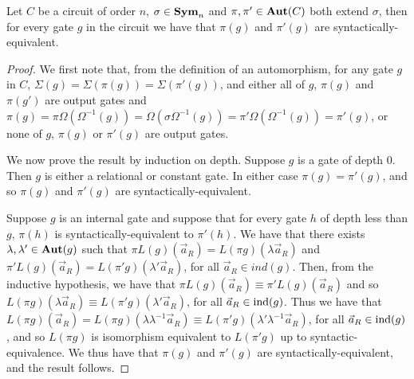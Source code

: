 \documentclass[../paper.tex]{subfiles}
\begin{document}
\begin{lem}
  Let $C$ be a circuit of order $n$, $\sigma \in \text{\textbf{Sym}}_n$ and $\pi, \pi' \in
  \text{\textbf{Aut}}(C)$ both extend $\sigma$, then for every gate $g$ in the circuit we have
  that $\pi (g)$ and $\pi'(g)$ are syntactically-equivalent.
  \label{lem:permutation-extending-syntactic-equivalence}
\end{lem}
\begin{proof}
  We first note that, from the definition of an automorphism, for any gate $g$
  in $C$, $\Sigma (g) = \Sigma (\pi (g)) = \Sigma (\pi' (g))$, and either all of
  $g$, $\pi (g)$ and $\pi (g')$ are output gates and $\pi (g) = \pi \Omega
  (\Omega^{-1}(g)) = \Omega (\sigma \Omega^{-1}(g)) = \pi' \Omega
  (\Omega^{-1}(g)) = \pi'(g)$, or none of $g$, $\pi(g)$ or $\pi' (g)$ are output gates.
  
  We now prove the result by induction on depth. Suppose $g$ is a gate of depth
  $0$. Then $g$ is either a relational or constant gate. In either case $\pi (g)
  = \pi' (g)$, and so $\pi(g)$ and $\pi'(g)$ are syntactically-equivalent.

  Suppose $g$ is an internal gate and suppose that for every gate $h$ of depth
  less than $g$, $\pi (h)$ is syntactically-equivalent to $\pi'(h)$. We have
  that there exists $\lambda, \lambda' \in \text{\textbf{Aut}}(g)$ such that $\pi
  L(g)(\vec{a}_R) = L(\pi g) (\lambda \vec{a}_R)$ and $\pi' L(g)(\vec{a}_R) =
  L(\pi' g)(\lambda' \vec{a}_R)$, for all $\vec{a}_R \in ind(g)$. Then, from the
  inductive hypothesis, we have that $\pi L(g)(\vec{a}_R) \equiv \pi
  'L(g)(\vec{a}_R)$ and so $L(\pi g)(\lambda \vec{a}_R) \equiv L(\pi' g)
  (\lambda' \vec{a}_R)$, for all $\vec{a}_R \in \text{\upshape ind}(g)$. Thus we have that
  $L(\pi g) (\vec{a}_R) = L (\pi g) (\lambda \lambda^{-1}\vec{a}_R) \equiv
  L(\pi' g) (\lambda' \lambda^{-1}\vec{a}_R)$, for all $\vec{a}_R \in \text{\upshape ind}(g)$,
  and so $L(\pi g)$ is isomorphism equivalent to $L(\pi'g)$ up to
  syntactic-equivalence. We thus have that $\pi (g) $ and $\pi' (g)$ are
  syntactically-equivalent, and the result follows.

  
\end{proof}
\end{document}
